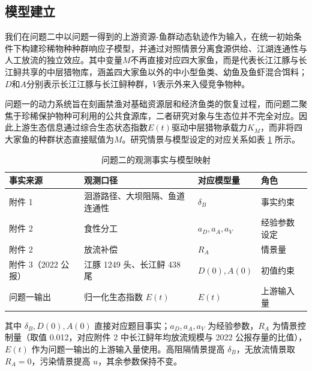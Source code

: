 \subsection{模型建立}
我们在问题二中以问题一得到的上游资源-鱼群动态轨迹作为输入，在统一初始条件下构建珍稀物种种群响应子模型，并通过对照情景分离食源供给、江湖连通性与人工放流的独立效应。其中变量$M$不再直接对应四大家鱼，而是代表长江江豚与长江鲟共享的中层猎物库，涵盖四大家鱼以外的中小型鱼类、幼鱼及鱼虾混合饵料；$D$和$A$分别表示长江江豚与长江鲟种群，$V$表示外来入侵竞争物种。

问题一的动力系统旨在刻画禁渔对基础资源层和经济鱼类的恢复过程，而问题二聚焦于珍稀保护物种可利用的公共食源库，二者研究对象与生态位并不完全对应。因此上游生态信息通过综合生态状态指数$E(t)$驱动中层猎物承载力$K_M$，而非将四大家鱼的种群状态直接赋值为$M$。研究情景与模型设定的对应关系如表 \ref{tab:q2map} 所示。
\begin{table}[htbp]
\centering
\caption{问题二的观测事实与模型映射}
\label{tab:q2map}
\begin{tabularx}{0.95\textwidth}{>{\raggedright\arraybackslash}p{2.4cm} >{\raggedright\arraybackslash}p{4.2cm} >{\raggedright\arraybackslash}p{3.6cm} X}
\toprule
事实来源 & 观测口径 & 对应模型量 & 角色 \\
\midrule
附件 1 & 洄游路径、大坝阻隔、鱼道连通性 & $\delta_B$ & 事实约束 \\
附件 2 & 食性分工 & $a_D,a_A,a_V$ & 经验参数设定 \\
附件 2 & 放流补偿 & $R_A$ & 情景量 \\
附件 3（2022 公报） & 江豚 1249 头、长江鲟 438 尾 & $D(0),A(0)$ & 初值约束 \\
问题一输出 & 归一化生态指数 $E(t)$ & $E(t)$ & 上游输入量 \\
\bottomrule
\end{tabularx}
\end{table}
其中 $\delta_B,D(0),A(0)$ 直接对应题目事实；$a_D,a_A,a_V$ 为经验参数，$R_A$ 为情景控制量（取值 0.012，对应附件 2 中长江鲟年均放流规模与 2022 公报存量的比值），$E(t)$ 作为问题一输出的上游输入量使用。高阻隔情景提高 $\delta_B$，无放流情景取 $R_A=0$，污染情景提高 $u$，其余参数保持不变。

